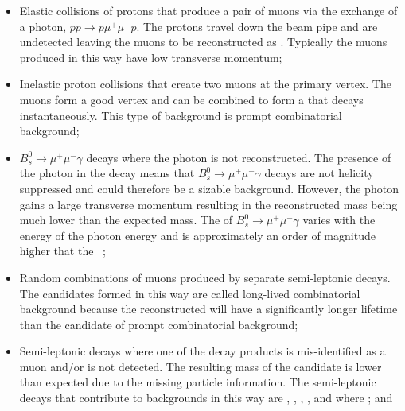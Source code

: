 \begin{itemize}
\item Elastic collisions of protons that produce a pair of muons via the exchange of a photon, $pp \to p \mu^{+} \mu^{-} p$. The protons travel down the beam pipe and are undetected leaving the muons to be reconstructed as \bmumu. Typically the muons produced in this way have low transverse momentum; %
\item Inelastic proton collisions that create two muons at the primary vertex. The muons form a good vertex and can be combined to form a \bsd that decays instantaneously. This type of background is prompt combinatorial background;
\item $B_{s}^{0}\to\mu^{+}\mu^{-}\gamma$ decays where the photon is not reconstructed. The presence of the photon in the decay means that $B_{s}^{0}\to\mu^{+}\mu^{-}\gamma$ decays are not helicity suppressed and could therefore be a sizable background. However, the photon gains a large transverse momentum resulting in the reconstructed \bsd mass being much lower than the expected \bs mass. The \BF of $B_{s}^{0}\to\mu^{+}\mu^{-}\gamma$ varies with the energy of the photon energy and is approximately an order of magnitude higher that the \bsmumu \BF~\cite{Bobeth:2013uxa,Melikhov:2004mk,Aditya:2012im}; 
\item Random combinations of muons produced by separate semi-leptonic decays. The \bmumu candidates formed in this way are called long-lived combinatorial background because the reconstructed \bsd will have a significantly longer lifetime than the \bsd candidate of prompt combinatorial background; %
\item Semi-leptonic decays where one of the decay products is mis-identified as a muon and/or is not detected. The resulting mass of the \bsd candidate is lower than expected due to the missing particle information. The semi-leptonic decays that contribute to \bmumu backgrounds in this way are \bdpimunu, \bsKmunu, \lambdab, \bupimumu, \bdpimumu and \bcjpsimunu where \jpsimumu; and %

\end{itemize}
